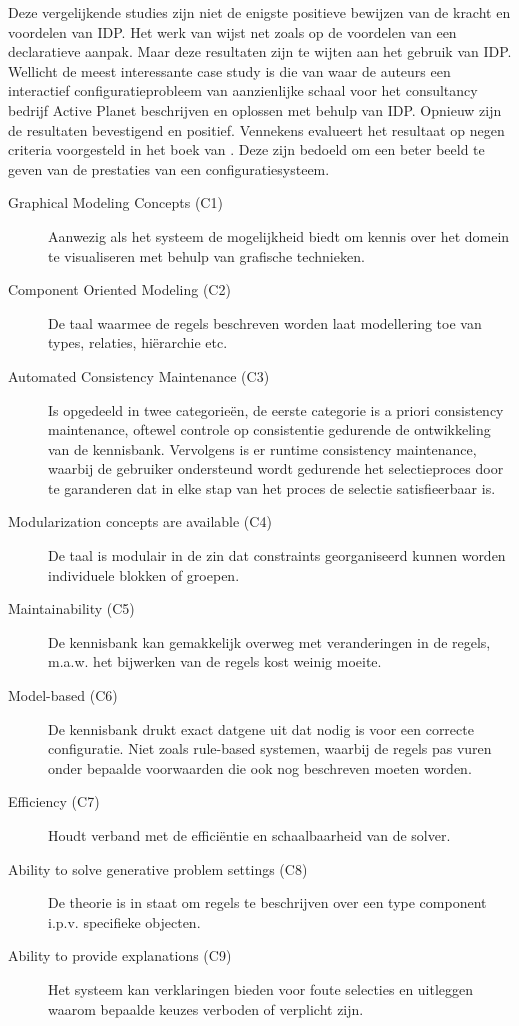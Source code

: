 Deze vergelijkende studies zijn niet de enigste positieve bewijzen van de kracht en voordelen van IDP. Het werk van \citep{vlaeminck2009logical} wijst net zoals \cite{gelle1996interactive} op de voordelen van een declaratieve aanpak. Maar deze resultaten zijn te wijten aan het gebruik van IDP. Wellicht de meest interessante case study is die van \citep{van2016kb} waar de auteurs een interactief configuratieprobleem van aanzienlijke schaal voor het consultancy bedrijf Active Planet beschrijven en oplossen met behulp van IDP. Opnieuw zijn de resultaten bevestigend en positief. Vennekens evalueert het resultaat op negen criteria voorgesteld in het boek van \citep{felfernig2014knowledge}. Deze zijn bedoeld om een beter beeld te geven van de prestaties van een configuratiesysteem. 
\begin{description}
\item[Graphical Modeling Concepts (C1)] Aanwezig als het systeem de mogelijkheid biedt om kennis over het domein te visualiseren met behulp van grafische technieken.
\item[Component Oriented Modeling (C2)] De taal waarmee de regels beschreven worden laat modellering toe van types, relaties, hi\"{e}rarchie etc.
\item[Automated Consistency Maintenance (C3)] Is opgedeeld in twee categorie\"{e}n, de eerste categorie is a priori consistency maintenance, oftewel controle op consistentie gedurende de ontwikkeling van de kennisbank. Vervolgens is er runtime consistency maintenance, waarbij de gebruiker ondersteund wordt gedurende het selectieproces door te garanderen dat in elke stap van het proces de selectie satisfieerbaar is.
\item[Modularization concepts are available (C4)] De taal is modulair in de zin dat constraints georganiseerd kunnen worden individuele blokken of groepen.
\item[Maintainability (C5)] De kennisbank kan gemakkelijk overweg met veranderingen in de regels, m.a.w. het bijwerken van de regels kost weinig moeite. 
\item[Model-based (C6)] De kennisbank drukt exact datgene uit dat nodig is voor een correcte configuratie. Niet zoals rule-based systemen, waarbij de regels pas vuren onder bepaalde voorwaarden die ook nog beschreven moeten worden.
\item[Efficiency (C7)] Houdt verband met de effici\"{e}ntie en schaalbaarheid van de solver.
\item[Ability to solve generative problem settings (C8)] De theorie is in staat om regels te beschrijven over een type component i.p.v. specifieke objecten.
\item[Ability to provide explanations (C9)] Het systeem kan verklaringen bieden voor foute selecties en uitleggen waarom bepaalde keuzes verboden of verplicht zijn.
\end{description}
